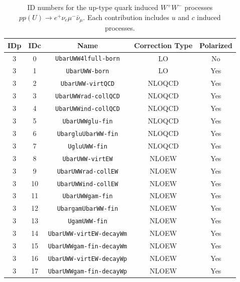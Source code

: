 \documentclass[english,12pt]{article}
\begin{document}
\begin{table}[th!]
\begin{center}
\begin{tabular}{|c|c|c|c|c|}\hline
IDp & IDc & Name & Correction Type & Polarized \\
\hline
3 & 0 & {\tt UbarUWW4lfull-born} & LO & No\\
3 & 1 & {\tt UbarUWW-born} & LO & Yes\\
3 & 2 & {\tt UbarUWW-virtQCD} & NLOQCD & Yes\\
3 & 3 & {\tt UbarUWWrad-collQCD} & NLOQCD & Yes\\
3 & 4 & {\tt UbarUWWind-collQCD} & NLOQCD & Yes\\
3 & 5 & {\tt UbarUWWglu-fin} & NLOQCD & Yes\\
3 & 6 & {\tt UbargluUbarWW-fin} & NLOQCD & Yes\\
3 & 7 & {\tt UgluUWW-fin} & NLOQCD & Yes\\
3 & 8 & {\tt UbarUWW-virtEW} & NLOEW & Yes\\
3 & 9 & {\tt UbarUWWrad-collEW} & NLOEW & Yes\\
3 & 10 & {\tt UbarUWWind-collEW} & NLOEW & Yes\\
3 & 11 & {\tt UbarUWWgam-fin} & NLOEW & Yes\\
3 & 12 & {\tt UbargamUbarWW-fin} & NLOEW & Yes\\
3 & 13 & {\tt UgamUWW-fin} & NLOEW & Yes\\
3 & 14 & {\tt UbarUWW-virtEW-decayWm} & NLOEW & Yes\\
3 & 15 & {\tt UbarUWWgam-fin-decayWm} & NLOEW & Yes\\
3 & 16 & {\tt UbarUWW-virtEW-decayWp} & NLOEW & Yes\\
3 & 17 & {\tt UbarUWWgam-fin-decayWp} & NLOEW & Yes\\
\hline
\end{tabular}
\caption{\small ID numbers for the up-type quark induced $W^+W^-$ processes $pp(U) \to e^+\nu_e\mu^-\bar{\nu}_\mu$. 
Each contribution includes $u$ and $c$ induced processes.}
\label{tab:IDs_proc_cont_WW_U}
\end{center}
\end{table}
\end{document}
